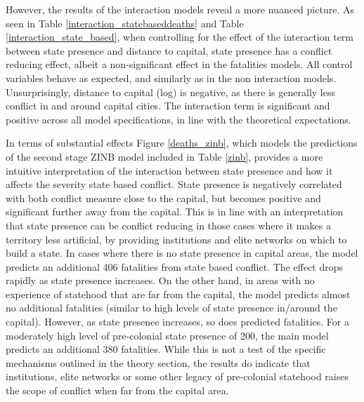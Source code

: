\documentclass[12pt]{article}
\begin{document}
However, the results of the interaction models reveal a more nuanced picture. As
seen in Table \ref{interaction_statebaseddeaths} and Table
\ref{interaction_state_based}, when controlling for the effect of the
interaction term between state presence and distance to capital, state presence
has a conflict reducing effect, albeit a non-significant effect in the
fatalities models. All control variables behave as expected, and similarly as in
the non interaction models. Unsurprisingly, distance to capital (log) is
negative, as there is generally less conflict in and around capital cities. The
interaction term is significant and positive across all model specifications, in
line with the theoretical expectations. 

In terms of substantial effects Figure \ref{deaths_zinb}, which models the
predictions of the second stage ZINB model included in Table \ref{zinb},
provides a more intuitive interpretation of the interaction between state
presence and how it affects the severity state based conflict. State presence is
negatively correlated with both conflict measure close to the capital, but
becomes positive and significant further away from the capital. This is in line
with an interpretation that state presence can be conflict reducing in those
cases where it makes a territory less artificial, by providing institutions and
elite networks on which to build a state. In cases where there is no state
presence in capital areas, the model predicts an additional 406 fatalities from
state based conflict. The effect drops rapidly as state presence increases. On
the other hand, in areas with no experience of statehood that are far from the
capital, the model predicts almost no additional fatalities (similar to high
levels of state presence in/around the capital). However, as state presence
increases, so does predicted fatalities. For a moderately high level of
pre-colonial state presence of 200, the main model predicts an additional 380
fatalities. While this is not a test of the specific mechanisms outlined in the
theory section, the results do indicate that institutions, elite networks or
some other legacy of pre-colonial statehood raises the scope of conflict
when far from the capital area.

\end{document}
